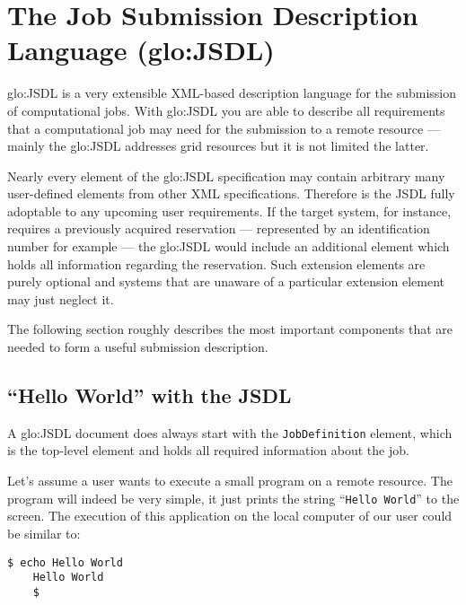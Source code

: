 \section[The Job Submission Description Language]
{The Job Submission Description Language (\gls{glo:JSDL})}
\label{sec:fundamentals:jsdl}

\gls{glo:JSDL} is a very extensible XML-based description language for the
submission  of computational jobs.   With \gls{glo:JSDL}  you are  able to
describe  all requirements  that  a  computational job  may  need for  the
submission to  a remote resource  --- mainly the  \gls{glo:JSDL} addresses
grid resources but it is not limited the latter.

Nearly  every  element of  the  \gls{glo:JSDL}  specification may  contain
arbitrary  many  user-defined  elements  from  other  XML  specifications.
Therefore is the  JSDL fully adoptable to any  upcoming user requirements.
If  the  target  system,  for  instance, requires  a  previously  acquired
reservation ---  represented by an  identification number for  example ---
the  \gls{glo:JSDL} would include  an additional  element which  holds all
information regarding the reservation.  Such extension elements are purely
optional and  systems that are  unaware of a particular  extension element
may just neglect it.

The following section roughly describes the most important components that
are needed to form a useful submission description.

\subsection{``Hello World'' with the JSDL}

A    \gls{glo:JSDL}    document     does    always    start    with    the
\texttt{JobDefinition} element,  which is the top-level  element and holds
all required information about the job.

Let's assume a user wants to execute a small program on a remote resource.
The  program  will  indeed be  very  simple,  it  just prints  the  string
``\texttt{Hello World}'' to the  screen. The execution of this application
on the local computer of our user could be similar to:

\begin{minipage}{0.75\textwidth}
  \begin{lstlisting}[language=ksh]
    $ echo Hello World
    Hello World
    $
  \end{lstlisting}
\end{minipage}

